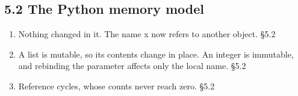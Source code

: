 \documentclass[11pt]{article}
\begin{document}
\begin{keepsection}\subsection{5.2 The Python memory model}

\begin{enumerate}
\item Nothing changed in it. The name x now refers to another object. \hfill{\small\color{FAUblue}§5.2}
\item A list is mutable, so its contents change in place. An integer is immutable, and rebinding the parameter affects only the local name. \hfill{\small\color{FAUblue}§5.2}
\item Reference cycles, whose counts never reach zero. \hfill{\small\color{FAUblue}§5.2}
\end{enumerate}

\end{keepsection}
\end{document}
